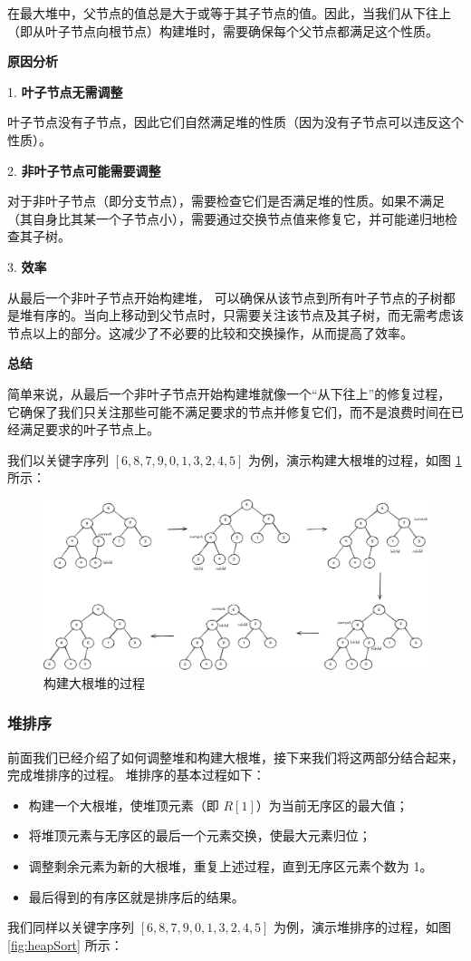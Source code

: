 \documentclass[lang=cn,newtx,10pt,scheme=chinese]{elegantbook}
\begin{document}
在最大堆中，父节点的值总是大于或等于其子节点的值。因此，当我们从下往上（即从叶子节点向根节点）构建堆时，需要确保每个父节点都满足这个性质。


\textbf{原因分析}  

1. \textbf{叶子节点无需调整}  

   叶子节点没有子节点，因此它们自然满足堆的性质（因为没有子节点可以违反这个性质）。

2. \textbf{非叶子节点可能需要调整}  

   对于非叶子节点（即分支节点），需要检查它们是否满足堆的性质。如果不满足（其自身比其某一个子节点小），需要通过交换节点值来修复它，并可能递归地检查其子树。

3. \textbf{效率}  

   从最后一个非叶子节点开始构建堆，
   可以确保从该节点到所有叶子节点的子树都是堆有序的。当向上移动到父节点时，只需要关注该节点及其子树，而无需考虑该节点以上的部分。这减少了不必要的比较和交换操作，从而提高了效率。


\textbf{总结}  

简单来说，从最后一个非叶子节点开始构建堆就像一个“从下往上”的修复过程，
它确保了我们只关注那些可能不满足要求的节点并修复它们，而不是浪费时间在已经满足要求的叶子节点上。


我们以关键字序列 $[6,8,7,9,0,1,3,2,4,5]$ 为例，演示构建大根堆的过程，如图 \ref{fig:heapBuild} 所示：

\begin{figure}[h!]
    \centering
    \includegraphics[width=1\textwidth]{./figure/pdf/cropped/heapBuild.pdf}
    \caption{构建大根堆的过程}
    \label{fig:heapBuild}
\end{figure}


\subsubsection{堆排序}

前面我们已经介绍了如何调整堆和构建大根堆，接下来我们将这两部分结合起来，完成堆排序的过程。
堆排序的基本过程如下：
\begin{itemize}
  \item 构建一个大根堆，使堆顶元素（即 $R[1]$）为当前无序区的最大值；
  \item 将堆顶元素与无序区的最后一个元素交换，使最大元素归位；
  \item 调整剩余元素为新的大根堆，重复上述过程，直到无序区元素个数为 1。
  \item 最后得到的有序区就是排序后的结果。
  \end{itemize}
我们同样以关键字序列 $[6,8,7,9,0,1,3,2,4,5]$ 为例，演示堆排序的过程，如图 \ref{fig:heapSort} 所示：
\end{document}
